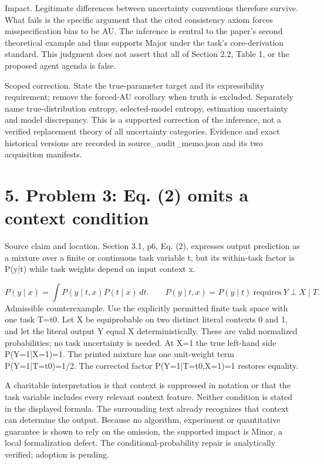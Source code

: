 \documentclass[10pt]{article}
\begin{document}
Impact. Legitimate differences between uncertainty conventions therefore survive. What fails is the specific argument that the cited consistency axiom forces misspecification bias to be AU. The inference is central to the paper’s second theoretical example and thus supports Major under the task’s core-derivation standard. This judgment does not assert that all of Section 2.2, Table 1, or the proposed agent agenda is false.\par
Scoped correction. State the true-parameter target and its expressibility requirement; remove the forced-AU corollary when truth is excluded. Separately name true-distribution entropy, selected-model entropy, estimation uncertainty and model discrepancy. This is a supported correction of the inference, not a verified replacement theory of all uncertainty categories. Evidence and exact historical versions are recorded in source\_audit\_memo.json and its two acquisition manifests.\par
\section*{5. Problem 3: Eq. (2) omits a context condition}
Source claim and location. Section 3.1, p6, Eq. (2), expresses output prediction as a mixture over a finite or continuous task variable t, but its within-task factor is P(y|t) while task weights depend on input context x.\par
\[P(y\mid x)=\int P(y\mid t,x)P(t\mid x)\,dt.\qquad P(y\mid t,x)=P(y\mid t)\ \text{requires}\ Y\perp X\mid T.\] Admissible counterexample. Use the explicitly permitted finite task space with one task T=t0. Let X be equiprobable on two distinct literal contexts 0 and 1, and let the literal output Y equal X deterministically. These are valid normalized probabilities; no task uncertainty is needed. At X=1 the true left-hand side P(Y=1|X=1)=1. The printed mixture has one unit-weight term P(Y=1|T=t0)=1/2. The corrected factor P(Y=1|T=t0,X=1)=1 restores equality.\par
A charitable interpretation is that context is suppressed in notation or that the task variable includes every relevant context feature. Neither condition is stated in the displayed formula. The surrounding text already recognizes that context can determine the output. Because no algorithm, experiment or quantitative guarantee is shown to rely on the omission, the supported impact is Minor, a local formalization defect. The conditional-probability repair is analytically verified; adoption is pending.\par
\end{document}
